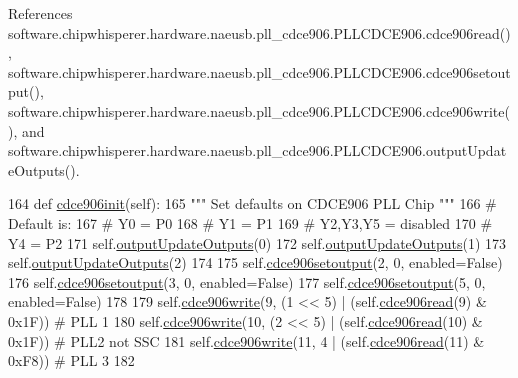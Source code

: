 References software.\+chipwhisperer.\+hardware.\+naeusb.\+pll\+\_\+cdce906.\+P\+L\+L\+C\+D\+C\+E906.\+cdce906read(), software.\+chipwhisperer.\+hardware.\+naeusb.\+pll\+\_\+cdce906.\+P\+L\+L\+C\+D\+C\+E906.\+cdce906setoutput(), software.\+chipwhisperer.\+hardware.\+naeusb.\+pll\+\_\+cdce906.\+P\+L\+L\+C\+D\+C\+E906.\+cdce906write(), and software.\+chipwhisperer.\+hardware.\+naeusb.\+pll\+\_\+cdce906.\+P\+L\+L\+C\+D\+C\+E906.\+output\+Update\+Outputs().


\begin{DoxyCode}
164     \textcolor{keyword}{def }\hyperlink{classsoftware_1_1chipwhisperer_1_1hardware_1_1naeusb_1_1pll__cdce906_1_1PLLCDCE906_ad93f5be1ef1c29f8c311cc7523bef531}{cdce906init}(self):
165         \textcolor{stringliteral}{""" Set defaults on CDCE906 PLL Chip """}
166         \textcolor{comment}{# Default is:}
167         \textcolor{comment}{# Y0 = P0}
168         \textcolor{comment}{# Y1 = P1}
169         \textcolor{comment}{# Y2,Y3,Y5 = disabled}
170         \textcolor{comment}{# Y4 = P2}
171         self.\hyperlink{classsoftware_1_1chipwhisperer_1_1hardware_1_1naeusb_1_1pll__cdce906_1_1PLLCDCE906_a50d1a9f7a7a440c15956e46a14e055d6}{outputUpdateOutputs}(0)
172         self.\hyperlink{classsoftware_1_1chipwhisperer_1_1hardware_1_1naeusb_1_1pll__cdce906_1_1PLLCDCE906_a50d1a9f7a7a440c15956e46a14e055d6}{outputUpdateOutputs}(1)
173         self.\hyperlink{classsoftware_1_1chipwhisperer_1_1hardware_1_1naeusb_1_1pll__cdce906_1_1PLLCDCE906_a50d1a9f7a7a440c15956e46a14e055d6}{outputUpdateOutputs}(2)
174 
175         self.\hyperlink{classsoftware_1_1chipwhisperer_1_1hardware_1_1naeusb_1_1pll__cdce906_1_1PLLCDCE906_a4f13e5a638ded665eb7a89944801d0e6}{cdce906setoutput}(2, 0, enabled=\textcolor{keyword}{False})
176         self.\hyperlink{classsoftware_1_1chipwhisperer_1_1hardware_1_1naeusb_1_1pll__cdce906_1_1PLLCDCE906_a4f13e5a638ded665eb7a89944801d0e6}{cdce906setoutput}(3, 0, enabled=\textcolor{keyword}{False})
177         self.\hyperlink{classsoftware_1_1chipwhisperer_1_1hardware_1_1naeusb_1_1pll__cdce906_1_1PLLCDCE906_a4f13e5a638ded665eb7a89944801d0e6}{cdce906setoutput}(5, 0, enabled=\textcolor{keyword}{False})
178 
179         self.\hyperlink{classsoftware_1_1chipwhisperer_1_1hardware_1_1naeusb_1_1pll__cdce906_1_1PLLCDCE906_a29165d60f9a6bae699dbf0022c3ed6d3}{cdce906write}(9, (1 << 5) | (self.\hyperlink{classsoftware_1_1chipwhisperer_1_1hardware_1_1naeusb_1_1pll__cdce906_1_1PLLCDCE906_a0fc35778fb0ba2a4a31fdeb4b55810ef}{cdce906read}(9) & 0x1F))  \textcolor{comment}{# PLL 1}
180         self.\hyperlink{classsoftware_1_1chipwhisperer_1_1hardware_1_1naeusb_1_1pll__cdce906_1_1PLLCDCE906_a29165d60f9a6bae699dbf0022c3ed6d3}{cdce906write}(10, (2 << 5) | (self.\hyperlink{classsoftware_1_1chipwhisperer_1_1hardware_1_1naeusb_1_1pll__cdce906_1_1PLLCDCE906_a0fc35778fb0ba2a4a31fdeb4b55810ef}{cdce906read}(10) & 0x1F))  \textcolor{comment}{# PLL2 not
       SSC}
181         self.\hyperlink{classsoftware_1_1chipwhisperer_1_1hardware_1_1naeusb_1_1pll__cdce906_1_1PLLCDCE906_a29165d60f9a6bae699dbf0022c3ed6d3}{cdce906write}(11, 4 | (self.\hyperlink{classsoftware_1_1chipwhisperer_1_1hardware_1_1naeusb_1_1pll__cdce906_1_1PLLCDCE906_a0fc35778fb0ba2a4a31fdeb4b55810ef}{cdce906read}(11) & 0xF8))  \textcolor{comment}{# PLL 3}
182 
\end{DoxyCode}
